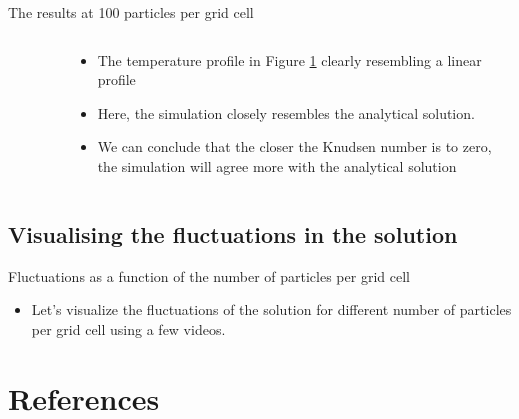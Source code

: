 \documentclass{beamer}
\begin{document}
        \begin{frame}{The results at 100 particles per grid cell}
            \begin{columns}
                \begin{column}{0.5\linewidth}
                    \begin{figure}
                        \centering
                        
                        \caption{}
                        \label{gra:kn0.1_100ppgc_kn0.02}
                    \end{figure}
                \end{column}
            
                \begin{column}{0.5\linewidth}
                    \begin{itemize}
                        \setlength\itemsep{0.25cm}
                                
                        \item<1->The temperature profile in Figure \ref{gra:kn0.1_100ppgc_kn0.02} clearly resembling a linear profile

                        \item<2->Here, the simulation closely resembles the analytical solution.

                        \item<3->We can conclude that the closer the Knudsen number is to zero, the simulation will agree more with the analytical solution
                    \end{itemize}                    
                \end{column} 
            \end{columns}
        \end{frame}

	\subsection{Visualising the fluctuations in the solution}
	
		\begin{frame}{Fluctuations as a function of the number of particles per grid cell}
			\begin{itemize}
				\item<1-> Let's visualize the fluctuations of the solution for different number of particles per grid cell using a few videos.
			\end{itemize}
		\end{frame}	       

\section{References}

    
    
\end{document}
